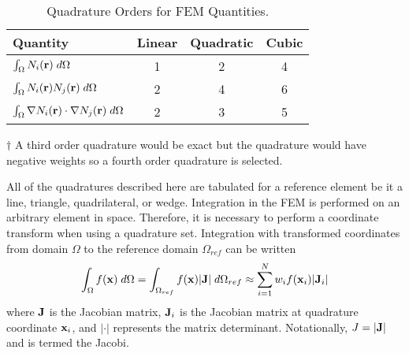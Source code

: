     \begin{table}
      \begin{center}
        \caption{Quadrature Orders for FEM Quantities.}
        \label{tab:quadrature_orders}
        \begin{threeparttable}
          \begin{tabular}{lccc}
            \toprule
            Quantity & Linear & Quadratic & Cubic \\
            \midrule
            $\int_{\Omega} N_i(\mathbf{r}) \;d\Omega$ & 1 & 2 & 4
              \tnote{$\dagger$} \\
            $\int_{\Omega} N_i(\mathbf{r}) N_j(\mathbf{r}) \;d\Omega$ &
              2 & 4 & 6 \\
            $\int_{\Omega} \mathbf{\nabla} N_i(\mathbf{r}) \cdot \mathbf{\nabla} N_j(\mathbf{r}) 
              \;d\Omega$ & 2 & 3 & 5 \\
            \bottomrule
          \end{tabular}
          \begin{tablenotes}
            \item[$\dagger$] A third order quadrature would be exact but the 
              quadrature would have negative weights so a fourth order 
              quadrature is selected.
          \end{tablenotes}
        \end{threeparttable}
      \end{center}
    \end{table}
    
    All of the quadratures described here are tabulated for a reference element
    be it a line, triangle, quadrilateral, or wedge. Integration in the 
    FEM is performed on an arbitrary element in space. Therefore, it is 
    necessary to perform a coordinate transform when using a quadrature set.
    Integration with transformed coordinates from domain $\Omega$ to the
    reference domain $\Omega_{ref}$ can be written
    \begin{equation}
      \int_{\Omega} f(\mathbf{x}) \;d\Omega = 
        \int_{\Omega_{ref}} f(\mathbf{x}) \lvert \mathbf{J} \rvert \;d\Omega_{ref} \approx
        \sum_{i=1}^{N} w_i f(\mathbf{x}_i) \lvert \mathbf{J}_i \rvert
    \end{equation}
    where $\mathbf{J}$ is the Jacobian matrix, $\mathbf{J}_i$ is the Jacobian matrix at 
    quadrature coordinate $\mathbf{x}_i$, and $\lvert \cdot \rvert$ represents
    the matrix determinant. Notationally, $J=\lvert \mathbf{J} \rvert$ and is termed
    the Jacobi.


